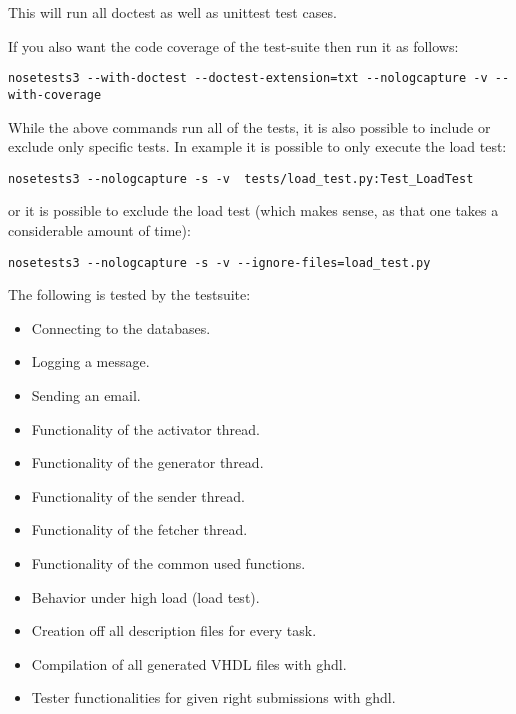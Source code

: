 This will run all doctest as well as unittest test cases.

If you also want the code coverage of the test-suite then run it as follows:

\begin{verbatim}
nosetests3 --with-doctest --doctest-extension=txt --nologcapture -v --with-coverage
\end{verbatim}

While the above commands run all of the tests, it is also possible to include or exclude only
specific tests. In example it is possible to only execute the load test:

\begin{verbatim}
nosetests3 --nologcapture -s -v  tests/load_test.py:Test_LoadTest
\end{verbatim}

or it is possible to exclude the load test (which makes sense, as that one takes a considerable
amount of time):

\begin{verbatim}
nosetests3 --nologcapture -s -v --ignore-files=load_test.py
\end{verbatim}

The following is tested by the testsuite:
\begin{itemize}
\item Connecting to the databases.
\item Logging a message.
\item Sending an email.
\item Functionality of the activator thread.
\item Functionality of the generator thread.
\item Functionality of the sender thread.
\item Functionality of the fetcher thread.
\item Functionality of the common used functions.
\item Behavior under high load (load test).
\item Creation off all description files for every task.
\item Compilation of all generated VHDL files with ghdl.
\item Tester functionalities for given right submissions with ghdl.
\end{itemize}

